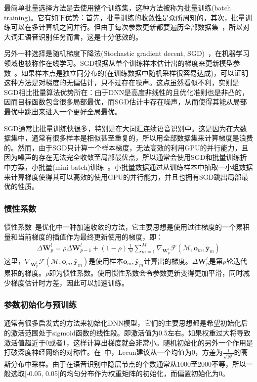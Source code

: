 最简单批量选择方法是去使用整个训练集，这种方法被称为批量训练(batch training)。它有如下优势：首先，批量训练的收敛性是众所周知的，其次，批量训练可以在多计算机之间并行。但由于每次参数更新都要遍历全部数据集~\cite{yu2010roles}，所以对大词汇语音识别任务而言，这是十分低效的。

另外一种选择是随机梯度下降法(Stochastic gradient decent, SGD)~\cite{bottou1998online}，在机器学习领域也被称作在线学习。SGD根据从单个训练样本估计出的梯度来更新模型参数~\cite{yu2010roles}。如果样本点是独立同分布的(在训练数据中随机采样很容易达成)，可以证明这种方法是对梯度的无偏估计，只不过存在噪声。这点虽然看似不利，实则是SGD相比批量算法优势所在：由于DNN是高度非线性的且优化准则也是非凸的，因而目标函数包含很多局部最优，而SGD估计中存在噪声，从而使得其能从局部最优中跳出来进入一个更好全局最优。

SGD通常比批量训练快很多，特别是在大词汇连续语音识别中。这是因为在大数据集中，通常有很多样本是相似甚至重复的，所以用全部数据集来计算梯度是浪费的。然而，由于SGD只计算一个样本梯度，无法高效的利用GPU的并行能力，且因为噪声的存在无法完全收敛至局部最优点，所以通常会使用SGD和批量训练折中方案，小批量(mini-batch)训练~\cite{yu2010roles}。小批量数据通过从训练样本中抽取一小组数据来计算梯度使得其可以高效的使用GPU的并行能力，并且也拥有SGD跳出局部最优的性质。

\subsubsection{惯性系数}
惯性系数~\cite{polyak1964some}是优化中一种加速收敛的方法，它主要思想是使用过往梯度的一个累积量和当前梯度的插值作为最终更新使用的梯度，即：
\begin{eqnarray}
    \Delta\mathbf{W}^l_p = \rho \Delta \mathbf{W}^l_{p-1} + (1-\rho) \frac{1}{M} \sum_{m=1}^M \nabla_{\mathbf{W}^l_p} \mathcal{F}(\mathcal{M}, \mathbf{o}_m, \bar{\mathbf{y}}_m)
\end{eqnarray}
这里，$\nabla_{\mathbf{W}^l_p} \mathcal{F}(\mathcal{M}, \mathbf{o}_m, \bar{\mathbf{y}}_m)$是使用样本$\mathbf{o}_m, \bar{\mathbf{y}}_m$计算出的梯度。$\Delta\mathbf{W}^l_p$是第$p$轮迭代累积的梯度。$\rho$即为惯性系数。使用惯性系数会令参数更新变得更加平滑，同时减少梯度估计时方差，因此可以加速训练。

\subsubsection{参数初始化与预训练}
通常有很多启发式的方法来初始化DNN模型，它们的主要思想都是希望初始化后的激活范围处于sigmoid函数的线性段。即激活值为0.5左右。如果权重过大将导致激活值趋近于0或者1，这样计算出梯度就会非常小。随机初始化的另外一个作用是打破深度神经网络的对称性。在~\cite{lecun1998efficient}中，Lecun建议从一个均值为0，方差为$\frac{1}{\sqrt{N^l}}$的高斯分布中采样。由于在语音识别中隐层节点的个数通常从1000至2000不等，所以一般选取[-0.05, 0.05]的均匀分布作为权重矩阵的初始化，而偏置初始化为0。

